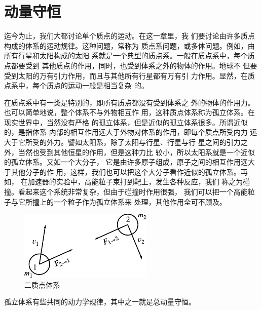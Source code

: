 \section{动量守恒}\label{sec:08.01}

迄今为止，我们大都讨论单个质点的运动。在这一章里，我
们要讨论由许多质点构成的体系的运动规律。这种问题，常称为
质点系问题，或多体问题。例如，由所有行星和太阳构成的太阳
系就是一个典型的质点系。一般在质点系中，每个质点都要受到
其他质点的作用，同时，也受到体系之外的物体的作用。地球不
但要受到太阳的万有引力作用，而且与其他所有行星都有万有引
力作用。显然，在质点系中，每个质点的运动一般是相当复杂
的。

在质点系中有一类是特别的，即所有质点都没有受到体系之
外的物体的作用力。也可以简单地说，整个体系不与外物相互作
用，这种质点体系称为孤立体系。在现实世界中，当然没有严格
的孤立体系，但是近似的孤立体系很多。所谓近似的，是指体系
内部的相互作用远大于外物对体系的作用，即每个质点所受内力
远大于它所受的外力。譬如太阳系，除了太阳与行星、行星与行
星之间的引力之外，当然也受到其他恒星的作用，但是这种力比
较小，所以太阳系就是一个近似的孤立体系。又如一个大分子，
它是由许多原子组成，原子之间的相互作用远大于其他分子的作
用，这样，我们也可以把这个大分子看作近似的孤立体系。再如，
在加速器的实验中，高能粒子束打到靶上，发生各种反应，我们
\clearpage\noindent
称之为碰撞。看起来这个系统非常复杂，但由于碰撞时作用很强，
我们可以把一个高能粒子与它所撞上的一个粒子作为孤立体系来
处理，其他作用全可不顾及。

\begin{figure}
  \vspace{-1.5em}
  \centering
  \includegraphics{figure/fig08.01}
  \caption{二质点体系}
  \label{fig:08.01}
\end{figure}
孤立体系有些共同的动力学规律，其中之一就是总动量守恒。

